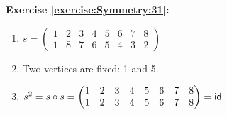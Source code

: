 \noindent\textbf{Exercise \ref{exercise:Symmetry:31}:}
\begin{enumerate}[{a.}]
\item
$s =\begin{pmatrix}
	1 & 2 & 3 & 4 & 5 & 6 & 7 & 8\\
	1 & 8 & 7 & 6 & 5 & 4 & 3 & 2
	\end{pmatrix}$
	
\item
Two vertices are fixed: 1 and 5.

\item
$s^2 = s\circ s = \begin{pmatrix}
	1 & 2 & 3 & 4 & 5 & 6 & 7 & 8\\
	1 & 2 & 3 & 4 & 5 & 6 & 7 & 8
	\end{pmatrix} = \sf{id}$
\end{enumerate}

